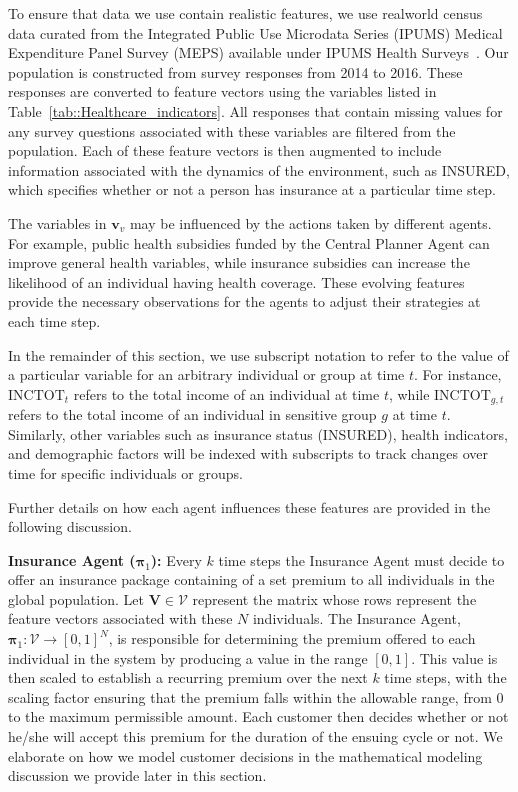 To ensure that data we use contain realistic features, we use realworld census data curated from the Integrated Public Use Microdata Series (IPUMS) Medical Expenditure Panel Survey (MEPS) available under IPUMS Health Surveys~\cite{blewett2024ipums}. Our population is constructed from survey responses from 2014 to 2016. These responses are converted to feature vectors using the variables listed in Table~\ref{tab::Healthcare_indicators}. All responses that contain missing values for any survey questions associated with these variables are filtered from the population. Each of these feature vectors is then augmented to include information associated with the dynamics of the environment, such as INSURED, which specifies whether or not a person has insurance at a particular time step.

The variables in $\mathbf{v}_{v}$ may be influenced by the actions taken by different agents. For example, public health subsidies funded by the Central Planner Agent can improve general health variables, while insurance subsidies can increase the likelihood of an individual having health coverage. These evolving features provide the necessary observations for the agents to adjust their strategies at each time step.

In the remainder of this section, we use subscript notation to refer to the value of a particular variable for an arbitrary individual or group at time $t$. For instance, $\text{INCTOT}_t$ refers to the total income of an individual at time $t$, while $\text{INCTOT}_{g,t}$ refers to the total income of an individual in sensitive group $g$ at time $t$. Similarly, other variables such as insurance status (INSURED), health indicators, and demographic factors will be indexed with subscripts to track changes over time for specific individuals or groups.

Further details on how each agent influences these features are provided in the following discussion.

\textbf{Insurance Agent ($\boldsymbol{\pi}_1$):} Every $k$ time steps the Insurance Agent must decide to offer an insurance package containing of a set premium to all individuals in the global population. Let $\mathbf{V}\in\mathcal{V}$ represent the matrix whose rows represent the feature vectors associated with these $N$ individuals. The Insurance Agent, $\boldsymbol{\pi}_1: \mathcal{V} \rightarrow [0,1]^{N}$, is responsible for determining the premium offered to each individual in the system by producing a value in the range $[0,1]$. This value is then scaled to establish a recurring premium over the next $k$ time steps, with the scaling factor ensuring that the premium falls within the allowable range, from 0 to the maximum permissible amount. Each customer then decides whether or not he/she will accept this premium for the duration of the ensuing cycle or not. We elaborate on how we model customer decisions in the mathematical modeling discussion we provide later in this section.

